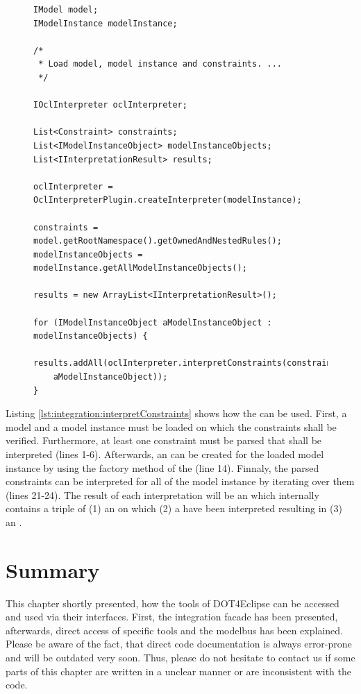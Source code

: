 \begin{figure}[!b]
\begin{lstlisting}[caption={How to interpret constraints.}, captionpos=b, label=lst:integration:interpretConstraints]
IModel model;
IModelInstance modelInstance;

/*
 * Load model, model instance and constraints. ...
 */

IOclInterpreter oclInterpreter;

List<Constraint> constraints;
List<IModelInstanceObject> modelInstanceObjects;
List<IInterpretationResult> results;

oclInterpreter = OclInterpreterPlugin.createInterpreter(modelInstance);

constraints = model.getRootNamespace().getOwnedAndNestedRules();
modelInstanceObjects = modelInstance.getAllModelInstanceObjects();

results = new ArrayList<IInterpretationResult>();

for (IModelInstanceObject aModelInstanceObject : modelInstanceObjects) {
  results.addAll(oclInterpreter.interpretConstraints(constraints,
  	aModelInstanceObject));
}
\end{lstlisting}
\end{figure}

Listing \ref{lst:integration:interpretConstraints} shows how the  can be used. First, a model and a model instance must be loaded on which the constraints shall be verified. Furthermore, at least one constraint must be parsed that shall be interpreted (lines 1-6). Afterwards, an  can be created for the loaded model instance by using the factory method of the  (line 14). Finnaly, the parsed constraints can be interpreted for all  of the model instance by iterating over them (lines 21-24). The result of each interpretation will be an  which internally contains a triple of (1) an  on which (2) a  have been interpreted resulting in (3) an .



\section{Summary}

This chapter shortly presented, how the tools of \acl{DOT4Eclipse} can be accessed and used via their interfaces. First, the integration facade has been presented, afterwards, direct access of specific tools and the modelbus has been explained. Please be aware of the fact, that direct code documentation is always error-prone and will be outdated very soon. Thus, please do not hesitate to contact us if some parts of this chapter are written in a unclear manner or are inconsistent with the code.